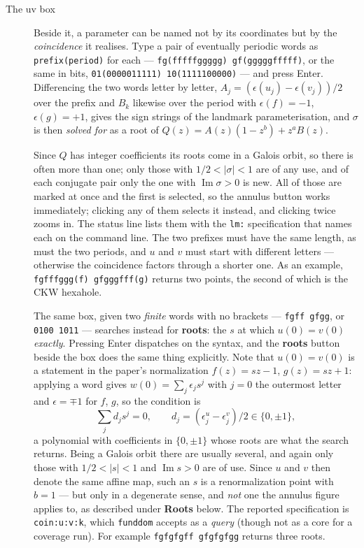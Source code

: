 \documentclass{amsart}
\begin{document}
\begin{description}
\item[The uv box] Beside it, a parameter can be named not by its coordinates but by the
\emph{coincidence} it realises.  Type a pair of eventually periodic words as
\texttt{prefix(period)} for each --- \texttt{fg(fffffggggg) gf(gggggfffff)}, or the same in
bits, \texttt{01(0000011111) 10(1111100000)} --- and press Enter.  Differencing the two words
letter by letter, $A_j = (\epsilon(u_j) - \epsilon(v_j))/2$ over the prefix and $B_k$ likewise
over the period with $\epsilon(f) = -1$, $\epsilon(g) = +1$, gives the sign strings of the
landmark parameterisation, and $\sigma$ is then \emph{solved for} as a root of
$Q(z) = A(z)(1-z^b) + z^aB(z)$.

Since $Q$ has integer coefficients its roots come in a Galois orbit, so there is often more
than one; only those with $1/2 < |\sigma| < 1$ are of any use, and of each conjugate pair only
the one with $\operatorname{Im}\sigma > 0$ is new.  All of those are marked at once and the
first is selected, so the annulus button works immediately; clicking any of them selects it
instead, and clicking twice zooms in.  The status line lists them with the \texttt{lm:}
specification that names each on the command line.  The two prefixes must have the same length,
as must the two periods, and $u$ and $v$ must start with different letters --- otherwise the
coincidence factors through a shorter one.  As an example, \texttt{fgfffggg(f) gfgggfff(g)}
returns two points, the second of which is the CKW hexahole.

The same box, given two \emph{finite} words with no brackets --- \texttt{fgff gfgg}, or
\texttt{0100 1011} --- searches instead for \textbf{roots}: the $s$ at which $u(0) = v(0)$
\emph{exactly}.  Pressing Enter dispatches on the syntax, and the \textbf{roots} button beside
the box does the same thing explicitly.  Note that $u(0) = v(0)$ is a statement in the paper's
normalization $f(z) = sz-1$, $g(z) = sz+1$: applying a word gives
$w(0) = \sum_j \epsilon_j s^j$ with $j = 0$ the outermost letter and $\epsilon = \mp 1$ for
$f$, $g$, so the condition is
\[ \sum_j d_j s^j = 0, \qquad d_j = (\epsilon^u_j - \epsilon^v_j)/2 \in \{0,\pm1\}, \]
a polynomial with coefficients in $\{0,\pm 1\}$ whose roots are what the search returns.
Being a Galois orbit there are usually several, and again only those with
$1/2 < |s| < 1$ and $\operatorname{Im} s > 0$ are of use.  Since $u$ and $v$ then denote the
same affine map, such an $s$ is a renormalization point with $b = 1$ --- but only in a degenerate
sense, and \emph{not} one the annulus figure applies to, as described under \textbf{Roots}
below.  The reported specification is \texttt{coin:u:v:k}, which \texttt{funddom} accepts as a
\emph{query} (though not as a core for a coverage run).  For example
\texttt{fgfgfgff gfgfgfgg} returns three roots.


\end{description}
\end{document}
